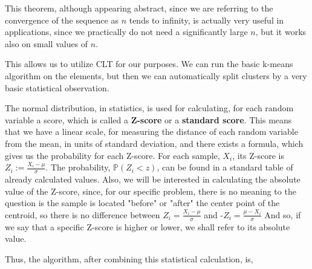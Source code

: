 \documentclass[12pt]{article}
\begin{document}
This theorem, although appearing abstract, since we are referring to the convergence of the sequence 
as $n$ tends to infinity, is actually very useful in applications, since we practically do not need a significantly large $n$, but it works also on small values of $n$.

This allows us to utilize CLT for our purposes. We can run the basic k-means algorithm on the elements, but then we can automatically split clusters by a very basic statistical observation.

The normal distribution, in statistics, is used for calculating, for each random variable a score, which is called a \textbf{Z-score} or a \textbf{standard score}. This means that we have a linear scale, for measuring the distance of each random variable from the mean, in units of standard deviation, and there exists a formula, which gives us the probability for each Z-score.
For each sample, $X_i$, its Z-score is $Z_i:=\frac{X_i-\mu}{\sigma}$. The probability, $\mathbb{P}(Z_i < z)$, can be found in a standard table of already calculated values. \newline
Also, we will be interested in calculating the absolute value of the Z-score, since, for our specific problem, there is no meaning to the question is the sample is located "before" or "after" the center point of the centroid, so there is no difference between $Z_i=\frac{X_i-\mu}{\sigma}$ and -$Z_i=\frac{\mu-X_i}{\sigma}$ \newline
And so, if we say that a specific Z-score is higher or lower, we shall refer to its absolute value. \newline

Thus, the algorithm, after combining this statistical calculation, is,
\end{document}
